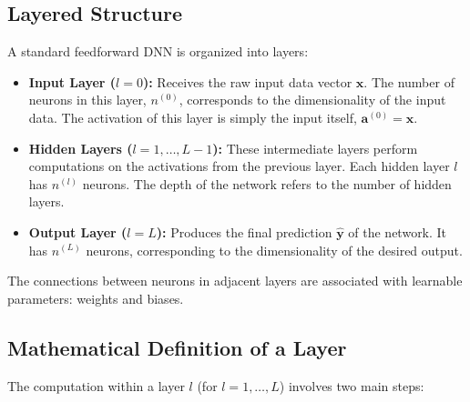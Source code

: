 \documentclass[11pt,twoside,openright]{report}
\begin{document}
\subsection{Layered Structure}
A standard feedforward DNN is organized into layers:
\begin{itemize}
    \item \textbf{Input Layer ($l=0$):} Receives the raw input data vector $\mathbf{x}$. The number of neurons in this layer, $n^{(0)}$, corresponds to the dimensionality of the input data. The activation of this layer is simply the input itself, $\mathbf{a}^{(0)} = \mathbf{x}$.
    \item \textbf{Hidden Layers ($l=1, \dots, L-1$):} These intermediate layers perform computations on the activations from the previous layer. Each hidden layer $l$ has $n^{(l)}$ neurons. The depth of the network refers to the number of hidden layers.
    \item \textbf{Output Layer ($l=L$):} Produces the final prediction $\hat{\mathbf{y}}$ of the network. It has $n^{(L)}$ neurons, corresponding to the dimensionality of the desired output.
\end{itemize}
The connections between neurons in adjacent layers are associated with learnable parameters: weights and biases.

\subsection{Mathematical Definition of a Layer}
The computation within a layer $l$ (for $l=1, \dots, L$) involves two main steps:
\end{document}
